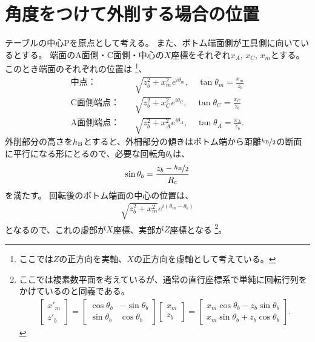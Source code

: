 \section{角度をつけて外削する場合の位置}
テーブルの中心Pを原点として考える。
また、ボトム端面側が工具側に向いているとする。
端面のA面側・C面側・中心の$X$座標をそれぞれ$x_A$, $x_C$, $x_m$とする。
このとき端面のそれぞれの位置は
\footnote{ここでは$Z$の正方向を実軸、$X$の正方向を虚軸として考えている。}、
\begin{subequations}
\begin{align*}
  \text{中点：}&\quad \sqrt{z_b^2+x_m^2}e^{i\theta_m}, \quad \tan\theta_m = \frac{x_m}{z_b}\\
  \text{C面側端点：}&\quad \sqrt{z_b^2+x_C^2}e^{i\theta_C}, \quad \tan\theta_C = \frac{x_C}{z_b}\\
  \text{A面側端点：}&\quad \sqrt{z_b^2+x_A^2}e^{i\theta_A}, \quad \tan\theta_A = \frac{x_A}{z_b}.
\end{align*}
\end{subequations}
外削部分の高さを$h_\text B$とすると、外柵部分の傾きはボトム端から距離$\nicefrac{h_\text B}2$の断面に平行になる形にとるので、必要な回転角$\theta_b$は、
\begin{align*}
  \sin\theta_b = \frac{z_b-\nicefrac{h_\text B}2}{R_\text c}
\end{align*}
を満たす。
回転後のボトム端面の中心の位置は、
\begin{align*}
  \sqrt{z_b^2+x_m^2}e^{i(\theta_m-\theta_b)}
\end{align*}
となるので、これの虚部が$X$座標、実部が$Z$座標となる
\footnote{ここでは複素数平面を考えているが、通常の直行座標系で単純に回転行列をかけているのと同義である。
\begin{align*}
  \left[
    \begin{array}{c}
      x'_m\\
      z'_b
    \end{array}
  \right]
  = \left[
    \begin{array}{cc}
      \cos\theta_b & -\sin\theta_b\\
      \sin\theta_b & \cos\theta_b
    \end{array}
  \right]\!\!
  \left[
    \begin{array}{c}
      x_m\\
      z_b
    \end{array}
  \right]
  = \left[
    \begin{array}{c}
      x_m\cos\theta_b-z_b\sin\theta_b\\
      x_m\sin\theta_b+z_b\cos\theta_b
    \end{array}
  \right].
\end{align*}}。

